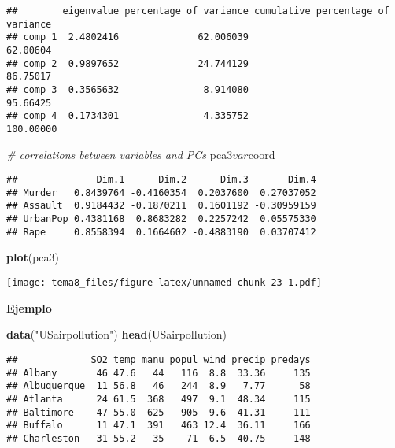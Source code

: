 \documentclass[]{article}
\newenvironment{Shaded}{\begin{snugshade}}{\end{snugshade}}
\newcommand{\KeywordTok}[1]{\textcolor[rgb]{0.13,0.29,0.53}{\textbf{{#1}}}}
\newcommand{\StringTok}[1]{\textcolor[rgb]{0.31,0.60,0.02}{{#1}}}
\newcommand{\CommentTok}[1]{\textcolor[rgb]{0.56,0.35,0.01}{\textit{{#1}}}}
\newcommand{\NormalTok}[1]{{#1}}
\numberwithin{equation}{section}
\begin{document}
\begin{verbatim}
##        eigenvalue percentage of variance cumulative percentage of variance
## comp 1  2.4802416              62.006039                          62.00604
## comp 2  0.9897652              24.744129                          86.75017
## comp 3  0.3565632               8.914080                          95.66425
## comp 4  0.1734301               4.335752                         100.00000
\end{verbatim}

\begin{Shaded}
\begin{Highlighting}[]
\CommentTok{# correlations between variables and PCs}
\NormalTok{pca3$var$coord}
\end{Highlighting}
\end{Shaded}

\begin{verbatim}
##              Dim.1      Dim.2      Dim.3       Dim.4
## Murder   0.8439764 -0.4160354  0.2037600  0.27037052
## Assault  0.9184432 -0.1870211  0.1601192 -0.30959159
## UrbanPop 0.4381168  0.8683282  0.2257242  0.05575330
## Rape     0.8558394  0.1664602 -0.4883190  0.03707412
\end{verbatim}

\begin{Shaded}
\begin{Highlighting}[]
\KeywordTok{plot}\NormalTok{(pca3)}
\end{Highlighting}
\end{Shaded}

\texttt{[image: tema8\_files/figure-latex/unnamed-chunk-23-1.pdf]}

\textbf{Ejemplo}

\begin{Shaded}
\begin{Highlighting}[]
\KeywordTok{data}\NormalTok{(}\StringTok{"USairpollution"}\NormalTok{)}
\KeywordTok{head}\NormalTok{(USairpollution)}
\end{Highlighting}
\end{Shaded}

\begin{verbatim}
##             SO2 temp manu popul wind precip predays
## Albany       46 47.6   44   116  8.8  33.36     135
## Albuquerque  11 56.8   46   244  8.9   7.77      58
## Atlanta      24 61.5  368   497  9.1  48.34     115
## Baltimore    47 55.0  625   905  9.6  41.31     111
## Buffalo      11 47.1  391   463 12.4  36.11     166
## Charleston   31 55.2   35    71  6.5  40.75     148
\end{verbatim}
\end{document}
